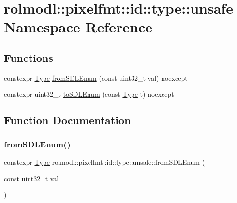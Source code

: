 \hypertarget{namespacerolmodl_1_1pixelfmt_1_1id_1_1type_1_1unsafe}{}\section{rolmodl\+::pixelfmt\+::id\+::type\+::unsafe Namespace Reference}
\label{namespacerolmodl_1_1pixelfmt_1_1id_1_1type_1_1unsafe}
\subsection*{Functions}
\begin{DoxyCompactItemize}
\item 
constexpr \mbox{\hyperlink{namespacerolmodl_1_1pixelfmt_1_1id_acacda2442a2997fe425e2faa4e5d002b}{Type}} \mbox{\hyperlink{namespacerolmodl_1_1pixelfmt_1_1id_1_1type_1_1unsafe_a3f8033f439c70193f22eb198abf00cc3}{from\+S\+D\+L\+Enum}} (const uint32\+\_\+t val) noexcept
\item 
constexpr uint32\+\_\+t \mbox{\hyperlink{namespacerolmodl_1_1pixelfmt_1_1id_1_1type_1_1unsafe_ab1ffad46f2336264c01ee66bdd90a5c0}{to\+S\+D\+L\+Enum}} (const \mbox{\hyperlink{namespacerolmodl_1_1pixelfmt_1_1id_acacda2442a2997fe425e2faa4e5d002b}{Type}} t) noexcept
\end{DoxyCompactItemize}


\subsection{Function Documentation}
\mbox{\label{namespacerolmodl_1_1pixelfmt_1_1id_1_1type_1_1unsafe_a3f8033f439c70193f22eb198abf00cc3}} 
\subsubsection{\texorpdfstring{fromSDLEnum()}{fromSDLEnum()}}
{\footnotesize\ttfamily constexpr \mbox{\hyperlink{namespacerolmodl_1_1pixelfmt_1_1id_acacda2442a2997fe425e2faa4e5d002b}{Type}} rolmodl\+::pixelfmt\+::id\+::type\+::unsafe\+::from\+S\+D\+L\+Enum (\begin{DoxyParamCaption}\item[{const uint32\+\_\+t}]{val }\end{DoxyParamCaption})\hspace{0.3cm}{\ttfamily [noexcept]}}




